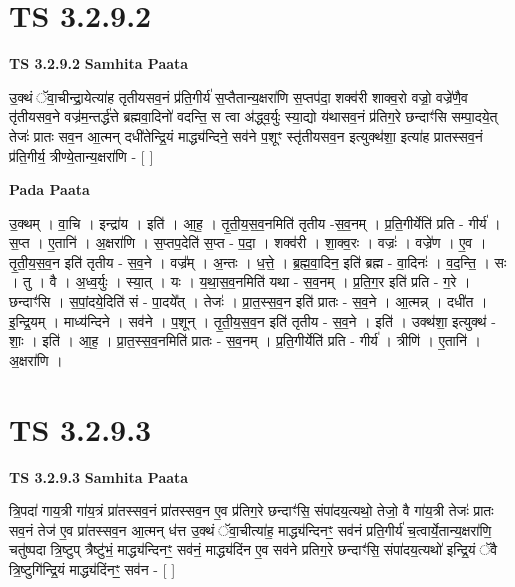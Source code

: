 \documentclass[17pt]{extarticle}
\begin{document}

\section{ TS 3.2.9.2 }

\textbf{TS 3.2.9.2 } \newline
\textbf{Samhita Paata} \newline

उ॒क्थं ॅवा॒चीन्द्रा॒येत्या॑ह तृतीयसव॒नं प्र॑ति॒गीर्य॑ स॒प्तैतान्य॒क्षरा॑णि स॒प्तप॑दा॒ शक्व॑री शाक्व॒रो वज्रो॒ वज्रे॑णै॒व तृ॑तीयसव॒ने वज्र॑म॒न्तर्द्ध॑त्ते ब्रह्मवा॒दिनो॑ वदन्ति॒ स त्वा अ॑द्ध्व॒र्युः स्या॒द्यो य॑थासव॒नं प्र॑तिग॒रे छन्दाꣳ॑सि सम्पा॒दये॒त् तेजः॑ प्रातः सव॒न आ॒त्मन् दधी॑तेन्द्रि॒यं माद्ध्य॑न्दिने॒ सव॑ने प॒शूꣳ स्तृ॑तीयसव॒न इत्युक्थ॑शा॒ इत्या॑ह प्रातस्सव॒नं प्र॑ति॒गीर्य॒ त्रीण्ये॒तान्य॒क्षरा॑णि - [  ] \newline

\textbf{Pada Paata} \newline

उ॒क्थम् । वा॒चि । इन्द्रा॑य । इति॑ । आ॒ह॒ । तृ॒ती॒य॒स॒व॒नमिति॑ तृतीय -स॒व॒नम् । प्र॒ति॒गीर्येति॑ प्रति - गीर्य॑ । स॒प्त । ए॒तानि॑ । अ॒क्षरा॑णि । स॒प्तप॒देति॑ स॒प्त - प॒दा॒ । शक्व॑री । शा॒क्व॒रः । वज्रः॑ । वज्रे॑ण । ए॒व । तृ॒ती॒य॒स॒व॒न इति॑ तृतीय - स॒व॒ने । वज्र᳚म् । अ॒न्तः । ध॒त्ते॒ । ब्र॒ह्म॒वा॒दिन॒ इति॑ ब्रह्म - वा॒दिनः॑ । व॒द॒न्ति॒ । सः । तु । वै । अ॒ध्व॒र्युः । स्या॒त् । यः । य॒था॒स॒व॒नमिति॑ यथा - स॒व॒नम् । प्र॒ति॒ग॒र इति॑ प्रति - ग॒रे । छन्दाꣳ॑सि । स॒पां॒दये॒दिति॑ सं - पा॒दये᳚त् । तेजः॑ । प्रा॒त॒स्स॒व॒न इति॑ प्रातः - स॒व॒ने । आ॒त्मन्न् । दधी॑त । इ॒न्द्रि॒यम् । माध्य॑न्दिने । सव॑ने । प॒शून् । तृ॒ती॒य॒स॒व॒न इति॑ तृतीय - स॒व॒ने । इति॑ । उक्थ॑शा॒ इत्युक्थ॑ - शाः॒ । इति॑ । आ॒ह॒ । प्रा॒त॒स्स॒व॒नमिति॑ प्रातः - स॒व॒नम् । प्र॒ति॒गीर्येति॑ प्रति - गीर्य॑ । त्रीणि॑ । ए॒तानि॑ । अ॒क्षरा॑णि ।  \newline





\section{ TS 3.2.9.3 }

\textbf{TS 3.2.9.3 } \newline
\textbf{Samhita Paata} \newline

त्रि॒पदा॑ गाय॒त्री गा॑य॒त्रं प्रा॑तस्सव॒नं प्रा॑तस्सव॒न ए॒व प्र॑तिग॒रे छन्दाꣳ॑सि॒ संपा॑दय॒त्यथो॒ तेजो॒ वै गा॑य॒त्री तेजः॑ प्रातः सव॒नं तेज॑ ए॒व प्रा॑तस्सव॒न आ॒त्मन् ध॑त्त उ॒क्थं ॅवा॒चीत्या॑ह॒ माद्ध्य॑न्दिनꣳ॒॒ सव॑नं प्रति॒गीर्य॑ च॒त्वार्ये॒तान्य॒क्षरा॑णि॒ चतु॑ष्पदा त्रि॒ष्टुप् त्रैष्टु॑भं॒ माद्ध्य॑न्दिनꣳ॒॒ सव॑नं॒ माद्ध्य॑दिंन ए॒व सव॑ने प्रतिग॒रे छन्दाꣳ॑सि॒ संपा॑दय॒त्यथो॑ इन्द्रि॒यं ॅवै त्रि॒ष्टुगि॑न्द्रि॒यं माद्ध्य॑दिंनꣳ॒॒ सव॑न - [  ] \newline
\end{document}
